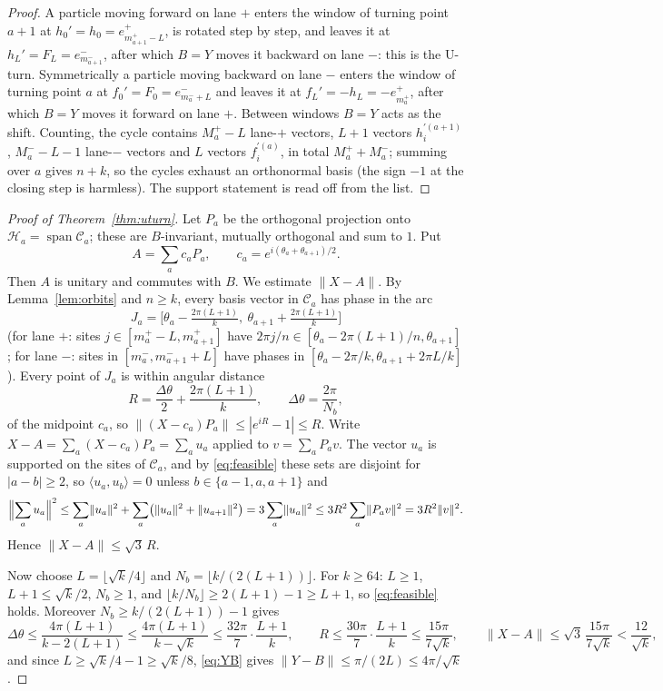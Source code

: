\documentclass[11pt]{amsart}
\theoremstyle{definition}
\theoremstyle{remark}
\newcommand{\norm}[1]{\lVert #1\rVert}
\begin{document}
\begin{proof}
A particle moving forward on lane $+$ enters the window of turning point $a+1$ at $h_0'=h_0=e^+_{m^+_{a+1}-L}$, is rotated step by step, and leaves it at $h_L'=F_L=e^-_{m^-_{a+1}}$, after which $B=Y$ moves it backward on lane $-$: this is the U-turn. Symmetrically a particle moving backward on lane $-$ enters the window of turning point $a$ at $f_0'=F_0=e^-_{m^-_a+L}$ and leaves it at $f_L'=-h_L=-e^+_{m^+_a}$, after which $B=Y$ moves it forward on lane $+$. Between windows $B=Y$ acts as the shift. Counting, the cycle contains $M^+_a-L$ lane-$+$ vectors, $L+1$ vectors $h^{\prime(a+1)}_i$, $M^-_a-L-1$ lane-$-$ vectors and $L$ vectors $f^{\prime(a)}_i$, in total $M^+_a+M^-_a$; summing over $a$ gives $n+k$, so the cycles exhaust an orthonormal basis (the sign $-1$ at the closing step is harmless). The support statement is read off from the list.
\end{proof}

\begin{proof}[Proof of Theorem~\ref{thm:uturn}]
Let $P_a$ be the orthogonal projection onto $\mathcal H_a=\operatorname{span}\mathcal C_a$; these are $B$-invariant, mutually orthogonal and sum to $1$. Put
\[
A=\sum_{a}c_aP_a,\qquad c_a=e^{i(\theta_a+\theta_{a+1})/2}.
\]
Then $A$ is unitary and commutes with $B$. We estimate $\norm{X-A}$. By Lemma~\ref{lem:orbits} and $n\ge k$, every basis vector in $\mathcal C_a$ has phase in the arc
\[
J_a=\bigl[\theta_a-\tfrac{2\pi(L+1)}k,\ \theta_{a+1}+\tfrac{2\pi(L+1)}k\bigr]
\]
(for lane $+$: sites $j\in[m^+_a-L,m^+_{a+1}]$ have $2\pi j/n\in[\theta_a-2\pi(L+1)/n,\theta_{a+1}]$; for lane $-$: sites in $[m^-_a,m^-_{a+1}+L]$ have phases in $[\theta_a-2\pi/k,\theta_{a+1}+2\pi L/k]$). Every point of $J_a$ is within angular distance
\[
R=\frac{\Delta\theta}{2}+\frac{2\pi(L+1)}{k},\qquad\Delta\theta=\frac{2\pi}{N_b},
\]
of the midpoint $c_a$, so $\norm{(X-c_a)P_a}\le|e^{iR}-1|\le R$. Write $X-A=\sum_a(X-c_a)P_a=\sum_a u_a$ applied to $v=\sum_aP_av$. The vector $u_a$ is supported on the sites of $\mathcal C_a$, and by \eqref{eq:feasible} these sets are disjoint for $|a-b|\ge2$, so $\langle u_a,u_b\rangle=0$ unless $b\in\{a-1,a,a+1\}$ and
\[
\Bigl\lVert\sum_au_a\Bigr\rVert^2\le\sum_a\norm{u_a}^2+\sum_a\bigl(\norm{u_a}^2+\norm{u_{a+1}}^2\bigr)=3\sum_a\norm{u_a}^2\le3R^2\sum_a\norm{P_av}^2=3R^2\norm v^2 .
\]
Hence $\norm{X-A}\le\sqrt3\,R$.

Now choose $L=\lfloor\sqrt k/4\rfloor$ and $N_b=\lfloor k/(2(L+1))\rfloor$. For $k\ge64$: $L\ge1$, $L+1\le\sqrt k/2$, $N_b\ge1$, and $\lfloor k/N_b\rfloor\ge2(L+1)-1\ge L+1$, so \eqref{eq:feasible} holds. Moreover $N_b\ge k/(2(L+1))-1$ gives
\[
\Delta\theta\le\frac{4\pi(L+1)}{k-2(L+1)}\le\frac{4\pi(L+1)}{k-\sqrt k}\le\frac{32\pi}{7}\cdot\frac{L+1}{k},\qquad
R\le\frac{30\pi}{7}\cdot\frac{L+1}{k}\le\frac{15\pi}{7\sqrt k},\qquad \norm{X-A}\le\sqrt3\,\frac{15\pi}{7\sqrt k}<\frac{12}{\sqrt k},
\]
and since $L\ge\sqrt k/4-1\ge\sqrt k/8$, \eqref{eq:YB} gives $\norm{Y-B}\le\pi/(2L)\le4\pi/\sqrt k$.
\end{proof}
\end{document}
